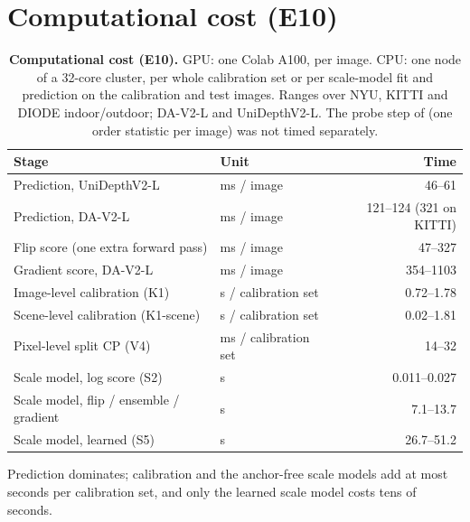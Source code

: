 \section{Computational cost (E10)}
\label{app:cost}
\begin{table}[h]
\centering\small
\caption{\textbf{Computational cost (E10).} GPU: one Colab A100, per image. CPU: one node of a 32-core cluster, per whole calibration set or per scale-model fit and prediction on the calibration and test images. Ranges over NYU, KITTI and DIODE indoor/outdoor; DA-V2-L and UniDepthV2-L. The probe step of \mDual (one order statistic per image) was not timed separately.}
\label{tab:cost}
\begin{tabular}{@{}llr@{}}
\toprule
Stage & Unit & Time \\
\midrule
Prediction, UniDepthV2-L & ms / image & 46--61 \\
Prediction, DA-V2-L & ms / image & 121--124 (321 on KITTI) \\
Flip score (one extra forward pass) & ms / image & 47--327 \\
Gradient score, DA-V2-L & ms / image & 354--1103 \\
\midrule
Image-level calibration (K1) & s / calibration set & 0.72--1.78 \\
Scene-level calibration (K1-scene) & s / calibration set & 0.02--1.81 \\
Pixel-level split CP (V4) & ms / calibration set & 14--32 \\
Scale model, log score (S2) & s & 0.011--0.027 \\
Scale model, flip / ensemble / gradient & s & 7.1--13.7 \\
Scale model, learned (S5) & s & 26.7--51.2 \\
\bottomrule
\end{tabular}
\end{table}
Prediction dominates; calibration and the anchor-free scale models add at most seconds per calibration set, and only the learned scale model costs tens of seconds.

